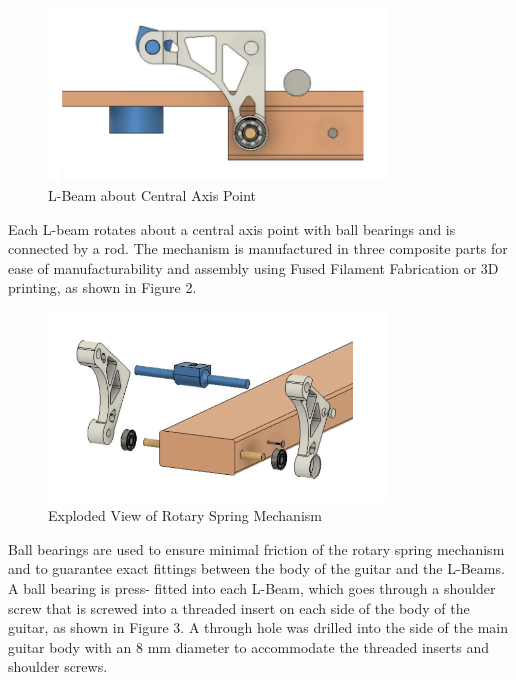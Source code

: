 \documentclass[12pt]{article}
\theoremstyle{definition} %
\theoremstyle{plain} %
\begin{document}
\begin{figure}[htbp]
  \centering
  \includegraphics[width=0.8\textwidth]{classes/Mathematics-of-Guitar-Strings/06-10/fgs/fig1.png}
  \caption{L-Beam about Central Axis Point}
  \label{fig:}
\end{figure}

Each L-beam rotates about a central axis point with ball bearings and is connected by a rod.
The mechanism is manufactured in three composite parts for ease of manufacturability and
assembly using Fused Filament Fabrication or 3D printing, as shown in Figure 2.

\begin{figure}[htbp]
  \centering
  \includegraphics[width=0.8\textwidth]{classes/Mathematics-of-Guitar-Strings/06-10/fgs/fig2.png}
  \caption{Exploded View of Rotary Spring Mechanism}
  \label{fig:}
\end{figure}

Ball bearings are used to ensure minimal friction of the rotary spring mechanism and to
guarantee exact fittings between the body of the guitar and the L-Beams. A ball bearing is press-
fitted into each L-Beam, which goes through a shoulder screw that is screwed into a threaded insert
on each side of the body of the guitar, as shown in Figure 3. A through hole was drilled into the
side of the main guitar body with an 8 mm diameter to accommodate the threaded inserts and
shoulder screws.
\end{document}
